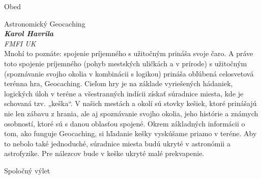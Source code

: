\documentclass[a4paper]{report}
\begin{document}
                    \begin{tcolorbox}[
                                    colback=red!10,
                    colframe=red!50!black,
                                fonttitle=\Large\bfseries,
                title=12:30
            ]
                {\Large Obed}
                                                            \end{tcolorbox}
                    \begin{tcolorbox}[
                                    colback=blue!10,
                    colframe=black!50!blue,
                                fonttitle=\Large\bfseries,
                title=14:00
            ]
                {\Large Astronomický Geocaching}
                                                            \\ \textbf{\textit{Karol Havrila}}
                                                    \\ \textit{FMFI UK}                \\[2ex]Mnohí to poznáte: spojenie príjemného s užitočným prináša svoje čaro. A práve toto spojenie príjemného (pohyb mestských uličkách a v prírode) s užitočným (spoznávanie svojho okolia v kombinácii s logikou) prináša obľúbená celosvetová terénna hra, Geocaching. Cieľom hry je na základe vyriešených hádaniek, logických úloh v teréne a všestranných indícii získať súradnice miesta, kde je schovaná tzv. „keška“. V našich mestách a okolí sú stovky kešiek, ktoré prinášajú nie len zábavu z hrania, ale aj spoznávanie svojho okolia, jeho histórie a známych osobností, ktoré sú s danou oblasťou spojené. Okrem základných informácii o tom, ako funguje Geocaching, si hľadanie kešky vyskúšame priamo v teréne. Aby to nebolo také jednoduché, súradnice miesta budú ukryté v astronómii a astrofyzike. Pre nálezcov bude v keške ukryté malé prekvapenie.
            \end{tcolorbox}
                    \begin{tcolorbox}[
                                    colback=green!10,
                    colframe=green!50!black,
                                fonttitle=\Large\bfseries,
                title=15:00
            ]
                {\Large Spoločný výlet}
                                                            \end{tcolorbox}
\end{document}
